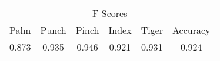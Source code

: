 \documentclass{standalone}
\begin{document}
 
 \begin{tabular}{|c|c|c|c|c ||c|}
\cline{1-6}\multicolumn{6}{|c|}{F-Scores} \\ 
\cline{1-6}Palm & Punch & Pinch & Index & Tiger & Accuracy\\ 
\cline{1-6}0.873 & 0.935 & 0.946 & 0.921 & 0.931 & 0.924\\ 
 \cline{1-6}\hline \end{tabular}
 
\end{document}
